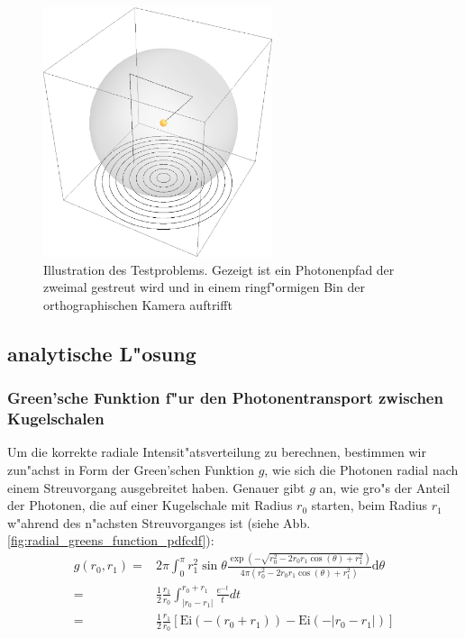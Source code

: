 	\begin{figure}
			\centering
			\includegraphics[width=0.6\textwidth]{testproblem_illustration.eps}
			\caption{Illustration des Testproblems. Gezeigt ist ein Photonenpfad der zweimal gestreut wird und in einem ringf"ormigen Bin der orthographischen Kamera auftrifft}
			\label{fig:testproblem_sketch}
	\end{figure}

	
	\subsection{analytische L"osung}\label{subsec:homsphere_analytic_solution}
	\subsubsection{Green'sche Funktion f"ur den Photonentransport zwischen Kugelschalen}
	Um die korrekte radiale Intensit"atsverteilung zu berechnen, bestimmen wir zun"achst in Form der Green'schen Funktion $g$, wie sich die Photonen radial nach einem Streuvorgang ausgebreitet haben.
	Genauer gibt $g$ an, wie gro"s der Anteil der Photonen, die auf einer Kugelschale mit Radius $r_0$ starten, beim Radius $r_1$ w"ahrend des n"achsten Streuvorganges ist (siehe Abb. \ref{fig:radial_greens_function_pdfcdf}):
	\begin{align*}
		g(r_0,r_1) =& 2 \pi \int_0^\pi r_1^2 \sin \theta \frac{\exp\left(-\sqrt{r_0^2-2 r_0 r_1 \cos(\theta)+r_1^2}\right)}{4 \pi (r_0^2-2 r_0 r_1 \cos(\theta)+r_1^2)} \text{d}\theta \\
		=& \frac{1}{2}\frac{r_1}{r_0} \int_{|r_0-r_1|}^{r_0+r_1} \frac{e^{-t}}{t} dt \\
		=& \frac{1}{2}\frac{r_1}{r_0}\left[\text{Ei}(-(r_0+r_1)) - \text{Ei}(-|r_0-r_1|)\right]
	\end{align*}
	
